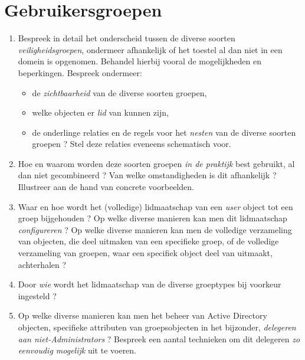 \documentclass{report}
\begin{document}
	\section{Gebruikersgroepen }
	\begin{enumerate}
		\item Bespreek in detail het onderscheid tussen de diverse soorten \textit{veiligheidsgroepen}, ondermeer afhankelijk of het toestel al dan niet in een domein is opgenomen. Behandel hierbij vooral de mogelijkheden en beperkingen. Bespreek ondermeer:
			\begin{itemize}
				\item de \textit{zichtbaarheid} van de diverse soorten groepen,
				\item welke objecten er \textit{lid} van kunnen zijn,
				\item de onderlinge relaties en de regels voor het \textit{nesten} van de diverse soorten groepen ? Stel deze relaties eveneens schematisch voor.
			\end{itemize}
		\item Hoe en waarom worden deze soorten groepen \textit{in de praktijk} best gebruikt, al dan niet gecombineerd ? Van welke omstandigheden is dit afhankelijk ? Illustreer aan de hand van concrete voorbeelden. 
		
		\item Waar en hoe wordt het (volledige) lidmaatschap van een \textit{user} object tot een groep bijgehouden ? Op welke diverse manieren kan men dit lidmaatschap \textit{configureren} ? Op welke diverse manieren kan men de volledige verzameling van objecten, die deel uitmaken van een specifieke groep, of de volledige verzameling van groepen, waar een specifiek object deel van uitmaakt, achterhalen ? 
		
		\item Door \textit{wie} wordt het lidmaatschap van de diverse groeptypes bij voorkeur ingesteld ?
		
		\item Op welke diverse manieren kan men het beheer van Active Directory objecten, specifieke attributen van groepsobjecten in het bijzonder, \textit{delegeren aan niet-Administrators} ? Bespreek een aantal technieken om dit delegeren \textit{zo eenvoudig mogelijk} uit te voeren.  
	\end{enumerate}
\end{document}
